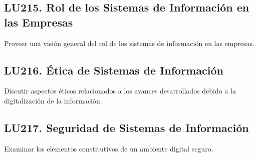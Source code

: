 \subsection{LU215. Rol de los Sistemas de Información en las Empresas}\label{sec:BOK-LU215}\label{sec:LU215}
\begin{LearningUnit}
\begin{LUGoal}
\item Proveer una visión general del rol de los sistemas de información en las empresas.
\end{LUGoal}

\end{LearningUnit}

\subsection{LU216. Ética de Sistemas de Información}\label{sec:BOK-LU216}\label{sec:LU216}
\begin{LearningUnit}
\begin{LUGoal}
\item Discutir aspectos éticos relacionados a los avances desarrollados debido a la digitalización de la información.
\end{LUGoal}

\end{LearningUnit}

\subsection{LU217. Seguridad de Sistemas de Información}\label{sec:BOK-LU217}\label{sec:LU217}
\begin{LearningUnit}
\begin{LUGoal}
\item Examinar los elementos constitutivos de un ambiente digital seguro.
\end{LUGoal}

\end{LearningUnit}

